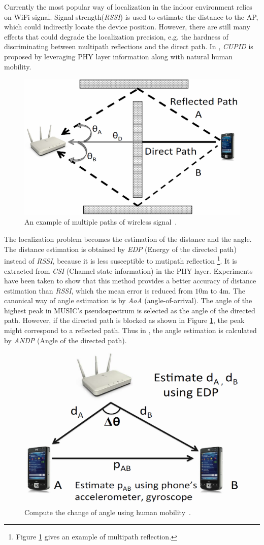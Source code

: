 \documentclass[letterpaper]{article}
\begin{document}
Currently the most popular way of localization in the indoor environment relies on WiFi signal. 
Signal strength(\emph{RSSI}) is used to estimate the distance to the AP, which could indirectly locate the device position.
However, there are still many effects that could degrade the localization precision, e.g. the hardness of discriminating between multipath reflections and the direct path.
In \cite{Nirjon:2014:CIL:2594368.2594378}, \emph{CUPID} is proposed by leveraging PHY layer information along with natural human mobility.
\begin{figure}
	\centering
	\includegraphics[width=0.7\linewidth]{fig/multipath.png}
	\caption{An example of multiple paths of wireless signal~\cite{Sen:2013:AMR:2462456.2464463}.}
	\label{fig:multipath}
\end{figure}
The localization problem becomes the estimation of the distance and the angle.
The distance estimation is obtained by \emph{EDP} (Energy of the directed path) instead of \emph{RSSI}, because it is less susceptible to mutipath reflection
\footnote{Figure \ref{fig:multipath} gives an example of multipath reflection.}.
It is extracted from \emph{CSI} (Channel state information) in the PHY layer. 
Experiments have been taken to show that this method provides a better accuracy of distance estimation than \emph{RSSI}, which the mean error is reduced from $ 10 $m to $ 4 $m.
The canonical way of angle estimation is by \emph{AoA} (angle-of-arrival).
The angle of the highest peak in MUSIC's pseudospectrum is selected as the angle of the directed path.
However, if the directed path is blocked as shown in Figure \ref{fig:multipath}, the peak might correspond to a reflected path.
Thus in \cite{Sen:2013:AMR:2462456.2464463}, the angle estimation is calculated by \emph{ANDP} (Angle of the directed path).
\begin{figure}
	\centering
	\includegraphics[width=0.7\linewidth]{fig/ANDP.png}
	\caption{Compute the change of angle using human mobility~\cite{Sen:2013:AMR:2462456.2464463}.}
	\label{fig:andp}
\end{figure}
\end{document}
